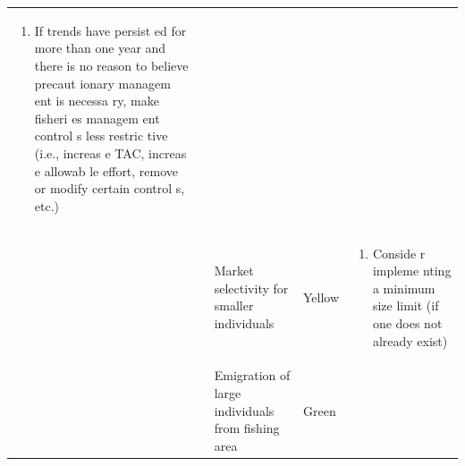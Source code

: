 \documentclass[]{book}
\providecommand{\tightlist}{%
  \setlength{\itemsep}{0pt}\setlength{\parskip}{0pt}}
\begin{document}
\begin{longtable}[]{@{}lllll@{}}
\begin{minipage}[t]{0.19\columnwidth}
\begin{enumerate}
\def\labelenumi{\arabic{enumi}.}
\setcounter{enumi}{1}
\tightlist
\item
  If trends have persist ed for more than one year and there is no
  reason to believe precaut ionary managem ent is necessa ry, make
  fisheri es managem ent control s less restric tive (i.e., increas e
  TAC, increas e allowab le effort, remove or modify certain control s,
  etc.)
\end{enumerate}\strut
\end{minipage}\tabularnewline
\begin{minipage}[t]{0.19\columnwidth}\raggedright\strut
\strut
\end{minipage} & \begin{minipage}[t]{0.19\columnwidth}\raggedright\strut
\strut
\end{minipage} & \begin{minipage}[t]{0.19\columnwidth}\raggedright\strut
Market selectivity for smaller individuals\strut
\end{minipage} & \begin{minipage}[t]{0.19\columnwidth}\raggedright\strut
Yellow\strut
\end{minipage} & \begin{minipage}[t]{0.19\columnwidth}\raggedright\strut
\begin{enumerate}
\def\labelenumi{\arabic{enumi}.}
\tightlist
\item
  Conside r impleme nting a minimum size limit (if one does not already
  exist)
\end{enumerate}\strut
\end{minipage}\tabularnewline
\begin{minipage}[t]{0.19\columnwidth}\raggedright\strut
\strut
\end{minipage} & \begin{minipage}[t]{0.19\columnwidth}\raggedright\strut
\strut
\end{minipage} & \begin{minipage}[t]{0.19\columnwidth}\raggedright\strut
Emigration of large individuals from fishing area\strut
\end{minipage} & \begin{minipage}[t]{0.19\columnwidth}\raggedright\strut
Green\strut
\end{minipage} & \begin{minipage}[t]{0.19\columnwidth}\raggedright\strut
\begin{enumerate}
\def\labelenumi{\arabic{enumi}.}

\end{enumerate}
\end{minipage}
\end{longtable}
\end{document}

